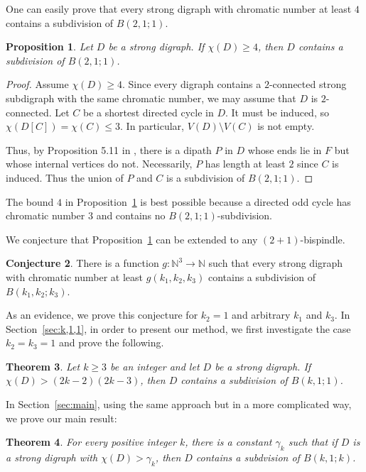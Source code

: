 \documentclass[utf8,10pt]{article}
\theoremstyle{plain}
\newtheorem{theorem}{Theorem}
\newtheorem{proposition}[theorem]{Proposition}
\theoremstyle{definition}
\newtheorem{conjecture}[theorem]{Conjecture}
\theoremstyle{remark}
\begin{document}
One can easily prove that  every strong digraph with chromatic number at least $4$ contains a subdivision of $B(2,1;1)$.
\begin{proposition}\label{prop:p211}
Let $D$ be a strong digraph.
If $\chi(D)\geq 4$, then $D$ contains a subdivision of $B(2,1;1)$.
\end{proposition}
\begin{proof}
Assume  $\chi(D)\geq 4$. Since every digraph contains a $2$-connected strong subdigraph with the same chromatic number, we may assume that $D$ is $2$-connected.
Let $C$ be a shortest directed cycle in $D$. 
It must be induced, so $\chi(D[C])=\chi(C) \leq 3$. In particular, $V(D)\setminus V(C)$ is not empty.

Thus, by Proposition 5.11 in \cite{BoMu08},  there is a dipath $P$ in $D$ whose ends lie in $F$ but whose internal
vertices do not. Necessarily, $P$ has length at least $2$ since $C$ is induced.
Thus the union of $P$ and $C$ is a subdivision of $B(2,1;1)$.
\end{proof}

The bound $4$ in Proposition~\ref{prop:p211} is best possible because a directed odd cycle has chromatic number $3$ and contains no $B(2,1;1)$-subdivision.


\medskip


We conjecture that Proposition~\ref{prop:p211} can be extended to any $(2+1)$-bispindle.
\begin{conjecture}\label{conj:3chemins}
There is a function $g:\mathbb{N}^3 \rightarrow \mathbb{N}$ such that  every strong digraph with chromatic number at least $g(k_1,k_2,k_3)$ contains
a subdivision of $B(k_1,k_2;k_3)$.
\end{conjecture}

As an evidence, we prove this conjecture for $k_2=1$ and arbitrary $k_1$ and $k_3$. In Section~\ref{sec:k,1,1}, in order to present our method, we first investigate the case $k_2=k_3=1$ and prove the following.


\begin{theorem}\label{th:P11k}
Let $k \geq 3$ be an integer and let $D$ be a strong digraph. If $\chi(D) >  (2k-2)(2k-3)$, then $D$ contains a subdivision of $B(k,1;1)$.
\end{theorem}

In Section~\ref{sec:main}, using the same approach but in a more complicated way, we prove our main result: 

\begin{theorem}\label{th:main}
For every positive integer $k$, there is a constant $\gamma_k$ such that if $D$ is a strong digraph with $\chi(D) > \gamma_k$, then $D$ contains a subdvision of $B(k,1;k)$.
\end{theorem}
\end{document}
